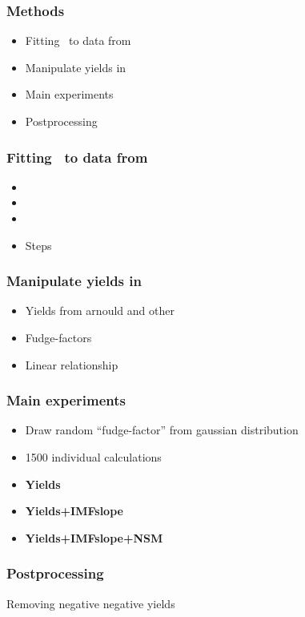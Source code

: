 \begin{frame}
\frametitle{Methods}
\begin{itemize}
\item Fitting \omegamodel\ to data from \eris
\item Manipulate yields in \omegamodel
\item Main experiments 
\item Postprocessing
\end{itemize}
\end{frame}

\begin{frame}
\frametitle{Fitting \omegamodel\ to data from \eris}
\begin{itemize}
\item {}
\item {}
\item {}
\item Steps
\end{itemize}
\end{frame}


\begin{frame}
\frametitle{Manipulate yields in \omegamodel}
\begin{itemize}
\item Yields from arnould and other \todo
\item Fudge-factors \todo
\item Linear relationship
\end{itemize}
\end{frame}

\begin{frame}
\frametitle{Main experiments }
\begin{itemize}
\item Draw random ``fudge-factor'' from gaussian distribution
\item 1500 individual calculations
\item \textbf{Yields}
\item \textbf{Yields+IMFslope}
\item \textbf{Yields+IMFslope+NSM}
\end{itemize}
\end{frame}

\begin{frame}
\frametitle{Postprocessing}
\begin{minipage}{0.45\linewidth}
\betadecay
\vfill
\end{minipage}
\hfill
\begin{minipage}{0.45\linewidth}
Removing negative negative yields
\vfill
\end{minipage}
\end{frame}
